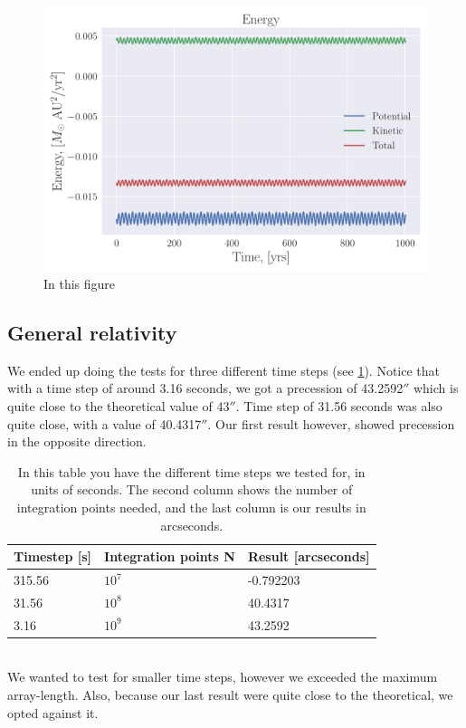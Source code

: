 \documentclass[reprint, english,notitlepage,nofootinbib]{revtex4-1}  %
\begin{document}
\begin{figure}[h]
	\centering
	\includegraphics[width=\linewidth]{../output/all-verlet-5-8-2_energy.pdf}
	\caption{In this figure 
		\label{fig:all_energy}}
\end{figure}

\subsection{General relativity}

We ended up doing the tests for three different time steps (see \ref{tab:general_relativity}). Notice that with a time step of around 3.16 seconds, we got a precession of 43.2592$''$ which is quite close to the theoretical value of 43$''$. Time step of 31.56 seconds was also quite close, with a value of 40.4317$''$. Our first result however, showed precession in the opposite direction.
\begin{table}[h]
	\begin{tabular}{|l|l|l|}
		\hline
		Timestep {[}s{]} & Integration points N & Result {[}arcseconds{]} \\
		\hline
		315.56              & $10^7$          & -0.792203               \\
		31.56               & $10^8$          & 40.4317                 \\
		3.16                & $10^9$          & 43.2592	\\
		\hline                
	\end{tabular}
	\caption{In this table you have the different time steps we tested for, in units of seconds. The second column shows the number of integration points needed, and the last column is our results in arcseconds. 
	\label{tab:general_relativity}}
\end{table}
\\
We wanted to test for smaller time steps, however we exceeded the maximum array-length. Also, because our last result were quite close to the theoretical, we opted against it.
\end{document}
